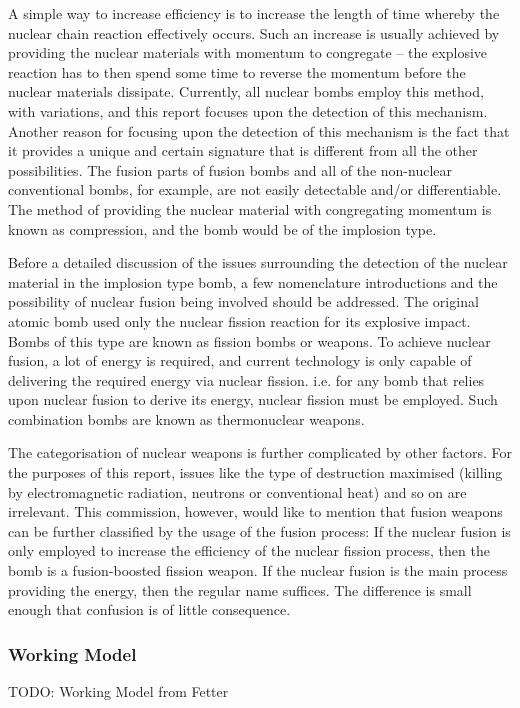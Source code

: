 \documentclass[twoside,titlepage,11pt,twocolumn,a4paper]{article}
\begin{document}
A simple way to increase efficiency is to increase the length of time
whereby the nuclear chain reaction effectively occurs. Such an
increase is usually achieved by providing the nuclear materials with
momentum to congregate -- the explosive reaction has to then spend
some time to reverse the momentum before the nuclear materials
dissipate. Currently, all nuclear bombs employ this method, with
variations, and this report focuses upon the detection of this
mechanism. Another reason for focusing upon the detection of this
mechanism is the fact that it provides a unique and certain signature
that is different from all the other possibilities. The fusion parts
of fusion bombs and all of the non-nuclear conventional bombs, for
example, are not easily detectable and/or differentiable. The method
of providing the nuclear material with congregating momentum is known
as compression, and the bomb would be of the implosion type.

Before a detailed discussion of the issues surrounding the detection
of the nuclear material in the implosion type bomb, a few
nomenclature introductions and the possibility of nuclear fusion being
involved should be addressed. The original atomic bomb used only the
nuclear fission reaction for its explosive impact. Bombs of this type
are known as fission bombs or weapons. To achieve nuclear fusion, a
lot of energy is required, and current technology is only capable of
delivering the required energy via nuclear fission. i.e. for any bomb
that relies upon nuclear fusion to derive its energy, nuclear fission
must be employed. Such combination bombs are known as thermonuclear
weapons.

The categorisation of nuclear weapons is further complicated by other
factors. For the purposes of this report, issues like the type of
destruction maximised (killing by electromagnetic radiation, neutrons
or conventional heat) and so on are irrelevant. This commission,
however, would like to mention that fusion weapons can be further
classified by the usage of the fusion process: If the nuclear fusion
is only employed to increase the efficiency of the nuclear fission
process, then the bomb is a fusion-boosted fission weapon. If the
nuclear fusion is the main process providing the energy, then the
regular name suffices. The difference is small enough that confusion
is of little consequence.

\subsubsection{Working Model}
TODO: Working Model from Fetter
\end{document}
